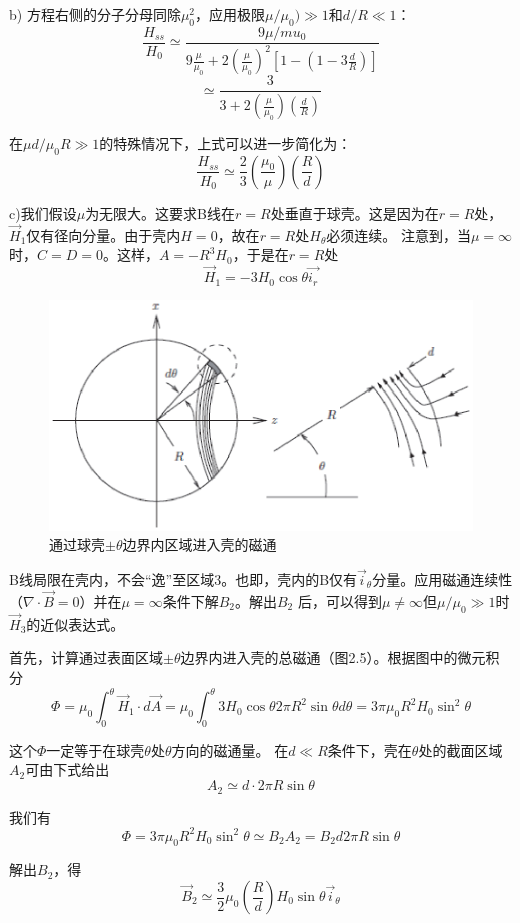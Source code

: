 b) 方程右侧的分子分母同除$\mu_0^2$，应用极限$\mu/\mu_0)\gg 1$和$d/R\ll 1$：
$$\frac{H_{ss}}{H_0}\simeq \frac{9\mu/mu_0}{9\frac{\mu}{\mu_0}+2(\frac{\mu}{\mu_0})^2[1-(1-3\frac{d}{R})]}$$
$$\simeq\frac{3}{3+2(\frac{\mu}{\mu_0})(\frac{d}{R})}$$

在$\mu d/\mu_0 R \gg 1$的特殊情况下，上式可以进一步简化为：
$$\frac{H_{ss}}{H_0}\simeq \frac{2}{3}(\frac{\mu_0}{\mu})(\frac{R}{d})$$

c)我们假设$\mu$为无限大。这要求B线在$r=R$处垂直于球壳。这是因为在$r=R$处，$\vec{H}_1$仅有径向分量。由于壳内$H=0$，故在$r=R$处$H_\theta$必须连续。
注意到，当$\mu=\infty$时，$C=D=0$。这样，$A=-R^3 H_0$，于是在$r=R$处
$$\vec{H}_1=-3 H_0 \cos\theta \vec{i_r}$$

\begin{figure}
	\centering
	\includegraphics[scale=0.7]{chpt2/figs/fig2.5.eps}
	\caption{通过球壳$\pm \theta$边界内区域进入壳的磁通}
\end{figure}

B线局限在壳内，不会“逸”至区域3。也即，壳内的B仅有$\vec{i}_\theta$分量。应用磁通连续性（$\nabla \cdot \vec{B}=0$）并在$\mu=\infty$条件下解$B_2$。解出$B_2$
后，可以得到$\mu \neq \infty$但$\mu/\mu_0 \gg 1$时$\vec{H}_3$的近似表达式。

首先，计算通过表面区域$\pm \theta$边界内进入壳的总磁通（图2.5）。根据图中的微元积分
$$
\Phi=\mu_0\int_{0}^{\theta} \vec{H}_1 \cdot d\vec{A}=\mu_0\int_{0}^{\theta} 3H_0\cos\theta 2\pi R^2 \sin\theta d\theta=3\pi\mu_0 R^2 H_0 \sin^2 \theta
$$

这个$\Phi$一定等于在球壳$\theta$处$\theta$方向的磁通量。
在$d\ll R$条件下，壳在$\theta$处的截面区域$A_2$可由下式给出
$$
A_2\simeq d\cdot 2\pi R\sin\theta
$$

我们有
$$\Phi=3\pi\mu_0 R^2 H_0 \sin^2 \theta\simeq B_2 A_2=B_2 d 2 \pi R \sin\theta$$

解出$B_2$，得
$$
\vec{B}_2\simeq \frac{3}{2}\mu_0 (\frac{R}{d}) H_0\sin\theta\vec{i}_\theta
$$

